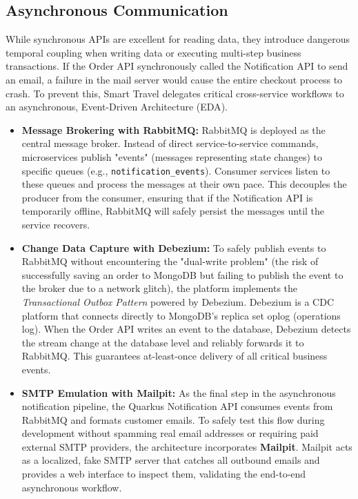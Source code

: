 \subsection{Asynchronous Communication}

While synchronous APIs are excellent for reading data, they introduce dangerous temporal coupling when writing data or executing multi-step business transactions. If the Order API synchronously called the Notification API to send an email, a failure in the mail server would cause the entire checkout process to crash. To prevent this, Smart Travel delegates critical cross-service workflows to an asynchronous, Event-Driven Architecture (\gls{EDA}).

\begin{itemize}
    \item \textbf{Message Brokering with RabbitMQ:} RabbitMQ is deployed as the central message broker. Instead of direct service-to-service commands, microservices publish "events" (messages representing state changes) to specific queues (e.g., \texttt{notification\_events}). Consumer services listen to these queues and process the messages at their own pace. This decouples the producer from the consumer, ensuring that if the Notification API is temporarily offline, RabbitMQ will safely persist the messages until the service recovers.
    
    \item \textbf{Change Data Capture with Debezium:} To safely publish events to RabbitMQ without encountering the "dual-write problem" (the risk of successfully saving an order to MongoDB but failing to publish the event to the broker due to a network glitch), the platform implements the \textit{Transactional Outbox Pattern} powered by Debezium. Debezium is a \gls{CDC} platform that connects directly to MongoDB's replica set oplog (operations log). When the Order API writes an event to the database, Debezium detects the stream change at the database level and reliably forwards it to RabbitMQ. This guarantees at-least-once delivery of all critical business events.
    
    \item \textbf{SMTP Emulation with Mailpit:} As the final step in the asynchronous notification pipeline, the Quarkus Notification API consumes events from RabbitMQ and formats customer emails. To safely test this flow during development without spamming real email addresses or requiring paid external SMTP providers, the architecture incorporates \textbf{Mailpit}. Mailpit acts as a localized, fake SMTP server that catches all outbound emails and provides a web interface to inspect them, validating the end-to-end asynchronous workflow.
\end{itemize}